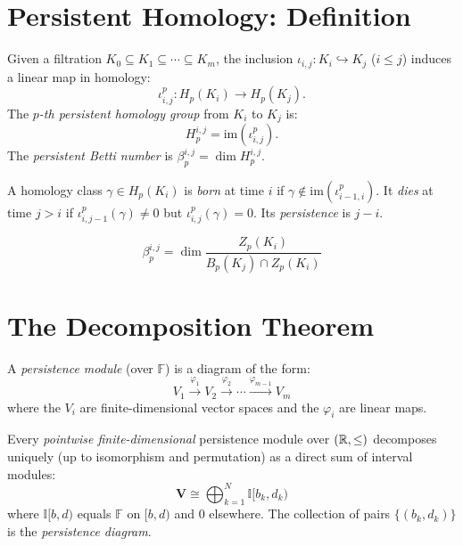 \section{Persistent Homology: Definition}

\begin{definition}
Given a filtration $K_0 \subseteq K_1 \subseteq \cdots \subseteq K_m$,
the inclusion $\iota_{i,j} : K_i \hookrightarrow K_j$ ($i \leq j$)
induces a linear map in homology:
\[
  \iota_{i,j}^p : H_p(K_i) \to H_p(K_j).
\]
The \emph{$p$-th persistent homology group} from $K_i$ to $K_j$ is:
\[
  H_p^{i,j} = \mathrm{im}(\iota_{i,j}^p).
\]
The \emph{persistent Betti number} is
$\beta_p^{i,j} = \dim H_p^{i,j}$.
\end{definition}

\begin{definition}
A homology class $\gamma \in H_p(K_i)$ is \emph{born} at time $i$ if
$\gamma \notin \mathrm{im}(\iota_{i-1,i}^p)$. It \emph{dies} at time
$j > i$ if $\iota_{i,j-1}^p(\gamma) \neq 0$ but
$\iota_{i,j}^p(\gamma) = 0$. Its \emph{persistence} is $j - i$.
\end{definition}

\begin{keyformulas}[title=\textbf{Persistent Betti Numbers}]
\[
  \beta_p^{i,j} = \dim \frac{Z_p(K_i)}{B_p(K_j) \cap Z_p(K_i)}
\]
\end{keyformulas}

\section{The Decomposition Theorem}

\begin{definition}
A \emph{persistence module} (over $\mathbb{F}$) is a diagram of the
form:
\[
  V_1 \xrightarrow{\varphi_1} V_2 \xrightarrow{\varphi_2}
  \cdots \xrightarrow{\varphi_{m-1}} V_m
\]
where the $V_i$ are finite-dimensional vector spaces and the
$\varphi_i$ are linear maps.
\end{definition}

\begin{theorem}
Every \emph{pointwise finite-dimensional} persistence module over
$(\mathbb{R}, \leq)$ decomposes uniquely (up to isomorphism and permutation)
as a direct sum of interval modules:
\[
  \mathbf{V} \cong \bigoplus_{k=1}^{N} \mathbb{I}[b_k, d_k)
\]
where $\mathbb{I}[b, d)$ equals $\mathbb{F}$ on $[b, d)$ and $0$
elsewhere. The collection of pairs $\{(b_k, d_k)\}$ is the
\emph{persistence diagram}.
\end{theorem}

